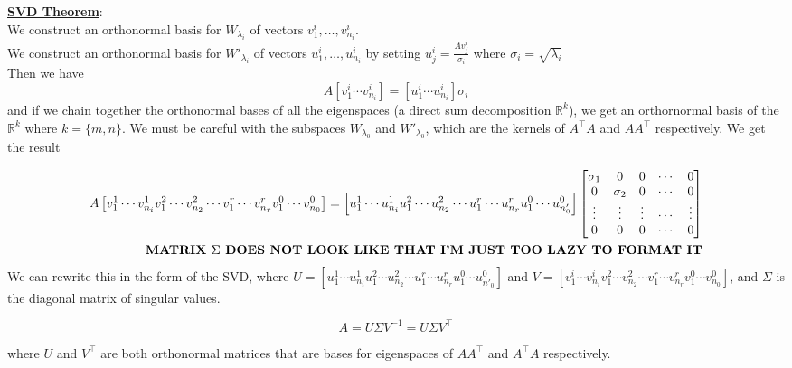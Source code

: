 \documentclass[11pt]{article}
\begin{document}
\newpage

\underline{\bf SVD Theorem}:\\
We construct an orthonormal basis for $W_{\lambda_i}$ of vectors $v_1^i,\dots,v_{n_i}^i$.\\
We construct an orthonormal basis for $W'_{\lambda_i}$ of vectors $u_1^i,\dots,u_{n_i}^i$ by setting $u_j^i = \frac{Av^i_j}{\sigma_i}$ where $\sigma_i = \sqrt{\lambda_i}$\\
Then we have
\begin{equation*}
A \left[ v_1^i \cdots v_{n_i}^i\right] = \left[ u_1^i \cdots u_{n_i}^i\right] \sigma_i
\end{equation*}
and if we chain together the orthonormal bases of all the eigenspaces (a direct sum decomposition $\mathbb{R}^k$), we get an orthornormal basis of the $\mathbb{R}^k$ where $k = \{m,n\}$. We must be careful with the subspaces $W_{\lambda_0}$ and $W'_{\lambda_0}$, which are the kernels of $A^\intercal A$ and $AA^\intercal$ respectively. We get the result

\begin{eqnarray*}
A \left[ v_1^1 \cdots v_{n_i}^1 v_1^2 \cdots v_{n_2}^2 \cdots v_1^r \cdots v_{n_r}^r  v_1^0 \cdots v_{n_0}^0 \right] = \left[u_1^1 \cdots u_{n_i}^1 u_1^2 \cdots u_{n_2}^2 \cdots u_1^r \cdots u_{n_r}^r  u_1^0 \cdots u_{n'_0}^0 \right]
            \begin{bmatrix}
            \sigma_1 & 0 & 0 & \cdots & 0 \\
            0 & \sigma_2 & 0 & \cdots & 0\\
            \vdots & \vdots & \vdots & \cdots & \vdots \\ 
            0 & 0 & 0 & \cdots & 0
            \end{bmatrix}\\
\text{{\bf MATRIX $\Sigma$ DOES NOT LOOK LIKE THAT I'M JUST TOO LAZY TO FORMAT IT}}
\end{eqnarray*}
We can rewrite this in the form of the SVD, where $U = \left[u_1^1 \cdots u_{n_i}^1 u_1^2 \cdots u_{n_2}^2 \cdots u_1^r \cdots u_{n_r}^r  u_1^0 \cdots u_{n'_0}^0 \right]$ and $V = \left[ v_1^i \cdots v_{n_i}^i v_1^2 \cdots v_{n_2}^2 \cdots v_1^r \cdots v_{n_r}^r  v_1^0 \cdots v_{n_0}^0 \right]$, and $\Sigma$ is the diagonal matrix of singular values.

\begin{equation*}
A = U\Sigma V^{-1} = U\Sigma V^\intercal
\end{equation*}

where $U$ and $V^\intercal$ are both orthonormal matrices that are bases for eigenspaces of $AA^\intercal$ and $A^\intercal A$ respectively. \\
\end{document}
